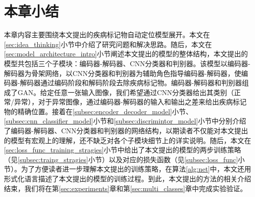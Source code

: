 \section{本章小结}\label{sec:chapter3_summary}
本章内容主要围绕本文提出的疾病标记物自动定位模型展开。本文在\ref{sec:idea_thinking}小节中介绍了研究问题和解决思路。随后，本文在\ref{sec:model_architecture_intro}小节阐述本文提出的模型的整体结构，本文提出的模型共包括三个子模块：编码器-解码器、CNN分类器和判别器。该模型以编码器-解码器为骨架网络，以CNN分类器和判别器为辅助角色指导编码器-解码器，使编码器-解码器通过编码阶段和解码阶段去除疾病标记物。编码器-解码器和判别器组成了GAN。给定任意一张输入图像，我们希望通过CNN分类器给出其类别（正常/异常），对于异常图像，通过编码器-解码器的输入和输出之差来给出疾病标记物的精确位置。接着在\ref{subsec:encoder_decoder_model}小节、\ref{subsec:cnn_classifier_model}小节和\ref{subsec:discrimintor_model}小节中分别介绍了编码器-解码器、CNN分类器和判别器的网络结构，以期读者不仅能对本文提出的模型有宏观上的理解，还不缺乏对各个子模块细节上的详实说明。随后，本文在\ref{sec:loss_func_training_stragies}小节中给出了本文提出的模型的两步训练策略（见\ref{subsec:traing_stragies}小节）以及对应的损失函数（见\ref{subsec:loss_func}小节）。为了方便读者进一步理解本文提出的训练策略，在算法\ref{alg:net}中，本文还用形式化语言描述了本文提出的模型的训练过程。到此，本文提出的方法的相关介绍结束，我们将在第\ref{sec:experiments}章和第\ref{sec:multi_classes}章中完成实验验证。
